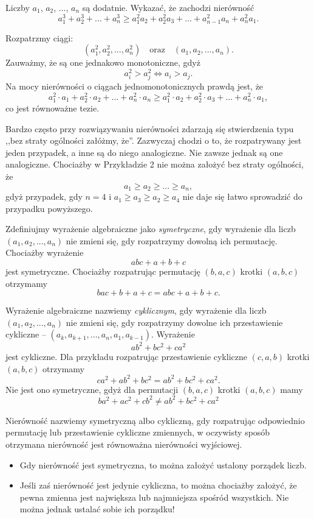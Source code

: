 
\noindent
Liczby $a_1$, $a_2$, ..., $a_n$ są dodatnie. Wykazać, że zachodzi nierówność
\[
	a_1^3 + a_2^3 + ... + a_n^3 \geqslant a_1^2a_2 + a_2^2a_3 + ... + a^2_{n - 1}a_n + a_n^2a_1.
\]


\noindent
Rozpatrzmy ciągi:
\[
	(a_1^2, a_2^2, ..., a_n^2) \quad \text{oraz} \quad (a_1, a_2, ..., a_n).
\]
Zauważmy, że są one jednakowo monotoniczne, gdyż
\[
	a_i^2 > a_j^2 \iff a_i > a_j.
\]
Na mocy nierówności o ciągach jednomonotonicznych prawdą jest, że
\[
	a_1^2 \cdot a_1 + a_2^2 \cdot a_2 + ... + a_n^2 \cdot a_n \geqslant a_1^2 \cdot a_2 + a_2^2 \cdot a_3 + ... + a_n^2 \cdot a_1,
\]
co jest równoważne tezie.

\newpage


\noindent
Bardzo często przy rozwiązywaniu nierówności zdarzają się stwierdzenia typu ,,bez straty ogólności załóżmy, że''. Zazwyczaj chodzi o to, że rozpatrywany jest jeden przypadek, a inne są do niego analogiczne. Nie zawsze jednak są one analogiczne. Chociażby w Przykładzie 2 nie można założyć bez straty ogólności, że
\[
	a_1 \geqslant a_2  \geqslant ... \geqslant a_n,
\]
gdyż przypadek, gdy $n = 4$ i $a_1 \geqslant a_3 \geqslant a_2 \geqslant a_4$ nie daje się łatwo sprowadzić do przypadku powyższego.
\vspace{10px}

\noindent
Zdefiniujmy wyrażenie algebraiczne jako \textit{symetryczne}, gdy wyrażenie dla liczb $(a_1, a_2, ..., a_n)$ nie zmieni się, gdy rozpatrzymy dowolną ich permutację. Chociażby wyrażenie
\[
	abc + a + b + c
\]
jest symetryczne. Chociażby rozpatrując permutację $(b, a, c)$ krotki $(a, b, c)$ otrzymamy
\[
	bac + b + a + c = abc + a + b + c.
\]

\noindent
Wyrażenie algebraiczne nazwiemy \textit{cyklicznym}, gdy wyrażenie dla liczb $(a_1, a_2, ..., a_n)$ nie zmieni się, gdy rozpatrzymy dowolne ich przestawienie cykliczne -- $(a_k, a_{k + 1}, ..., a_n, a_1,  a_{k - 1})$. Wyrażenie
\[
	ab^2 + bc^2 + ca^2
\]
jest cykliczne. Dla przykładu rozpatrując przestawienie cykliczne $(c, a, b)$ krotki $(a, b, c)$ otrzymamy
\[
	ca^2 + ab^2 + bc^2 = ab^2 + bc^2 + ca^2.
\]
Nie jest ono symetryczne, gdyż dla permutacji $(b, a, c)$ krotki $(a, b, c)$ mamy
\[
	ba^2 + ac^2 + cb^2 \neq ab^2 + bc^2 + ca^2
\]

\noindent
Nierówność nazwiemy symetryczną albo cykliczną, gdy rozpatrując odpowiednio permutację lub przestawienie cykliczne zmiennych, w oczywisty sposób otrzymana nierówność jest równoważna nierówności wyjściowej.
\begin{itemize}
	\item Gdy nierówność jest symetryczna, to można założyć ustalony porządek liczb. 
	\item Jeśli zaś nierówność jest jedynie cykliczna, to można chociażby założyć, że pewna zmienna jest największa lub najmniejsza spośród wszystkich. Nie można jednak ustalać sobie ich porządku!
\end{itemize}


